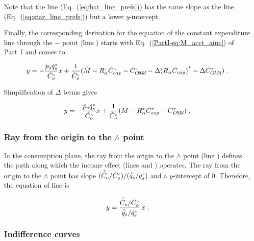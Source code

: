 Note that the \hathat{} line (Eq.~(\ref{eq:hat_line_prefs})) has the same slope as 
the \starstar{} line (Eq.~(\ref{eq:star_line_prefs}))
but a lower $y$-intercept.

Finally, the corresponding derivation
for the equation of the constant expenditure line through the 
$-$ point (line \barbar{}) starts with Eq.~(\ref{PartI-eq:M_acct_ainc}) of Part~I 
and comes to

\begin{equation} 
  y = - \frac{\tilde{p}_s {}{\dot{q}}^{\scriptscriptstyle \circ}_s}{{}{\dot{C}}^{\scriptscriptstyle \circ}_o} x
        + \frac{1}{{}{\dot{C}}^{\scriptscriptstyle \circ}_o} (\dot{M} - {}{R}^{\scriptscriptstyle \circ}_\alpha {}{\dot{C}}^{\scriptscriptstyle \circ}_{cap} - {}{\dot{C}}^{\scriptscriptstyle \circ}_{O\!M\!d}
                                   - \Delta {(R_\alpha \dot{C}_{cap})}^* - \Delta {\dot{C}}^*_{O\!M\!d}) \; .
\end{equation}

Simplification of $\Delta$ terms gives

\begin{equation} \label{eq:bar_line_prefs}
  y = - \frac{\tilde{p}_s {}{\dot{q}}^{\scriptscriptstyle \circ}_s}{{}{\dot{C}}^{\scriptscriptstyle \circ}_o} x
        + \frac{1}{{}{\dot{C}}^{\scriptscriptstyle \circ}_o} (\dot{M} - {R}^*_\alpha {\dot{C}}^*_{cap} - {\dot{C}}^*_{O\!M\!d}) \; .
\end{equation}
%


\subsubsection{Ray from the origin to the $\wedge$ point} 
\label{sec:pref_graph_ray}

In the consumption plane,
the ray from the origin to the $\wedge$ point 
(line \rr{})
defines the path along which the income effect
(lines \hatd{} and \dbar{})
operates.
The ray from the origin to the $\wedge$ point
has slope $(\hat{\dot{C}}_o/{}{\dot{C}}^{\scriptscriptstyle \circ}_o) / (\hat{\dot{q}}_s/{}{\dot{q}}^{\scriptscriptstyle \circ}_s)$
and a $y$-intercept of 0.
Therefore, the equation of line \rr{} is

\begin{equation} \label{eq:ray_cons}
  y = \frac{\hat{\dot{C}}_o/{}{\dot{C}}^{\scriptscriptstyle \circ}_o}{\hat{\dot{q}}_s/{}{\dot{q}}^{\scriptscriptstyle \circ}_s} \, x \; .
\end{equation}


\subsubsection{Indifference curves} 
\label{sec:cons_graph_indifference_curves}

